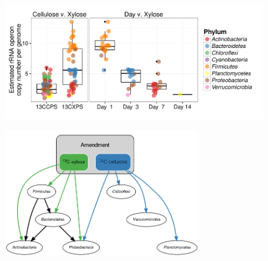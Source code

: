 \begin{figure}[H] \begin{center}
\centerline{\includegraphics[width=\textwidth]{figures/copy_number/copy_number.pdf}}
\caption{\protect}\label{fig:copy}
\end{center} \end{figure}

\begin{figure}[H]
	\begin{center}
    \centerline{\includegraphics[width=0.75\textwidth]{figures/foodweb/foodweb.png}}
    \caption{\protect}\label{fig:foodweb}
    \end{center} 
\end{figure}


